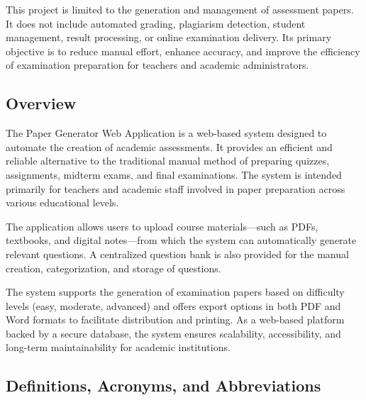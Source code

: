 \documentclass[12pt]{article}
\begin{document}
	
	This project is limited to the generation and management of assessment papers. It does not include automated grading, plagiarism detection, student management, result processing, or online examination delivery. Its primary objective is to reduce manual effort, enhance accuracy, and improve the efficiency of examination preparation for teachers and academic administrators.
	
	\subsection{Overview}
	The Paper Generator Web Application is a web-based system designed to automate the creation of academic assessments. It provides an efficient and reliable alternative to the traditional manual method of preparing quizzes, assignments, midterm exams, and final examinations. The system is intended primarily for teachers and academic staff involved in paper preparation across various educational levels.
	
	The application allows users to upload course materials—such as PDFs, textbooks, and digital notes—from which the system can automatically generate relevant questions. A centralized question bank is also provided for the manual creation, categorization, and storage of questions.
	
	The system supports the generation of examination papers based on difficulty levels (easy, moderate, advanced) and offers export options in both PDF and Word formats to facilitate distribution and printing. As a web-based platform backed by a secure database, the system ensures scalability, accessibility, and long-term maintainability for academic institutions.
	
	\subsection{Definitions, Acronyms, and Abbreviations}
	
\end{document}
